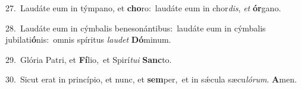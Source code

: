 {\numbfont\textcolor{\numbcolor}{27.}}~Laudáte eum in týmpano, et \textbf{cho}\-ro:~\star laudáte eum in chor\-\textit{dis}\-, \textit{et} \textbf{ór}\-gano.\par
{\numbfont\textcolor{\numbcolor}{28.}}~Laudáte eum in cýmbalis benesonántibus:~\dagger laudáte eum in cýmbalis jubilati\-\textbf{ó}\-nis:~\star omnis spíritus \textit{lau}\-\textit{det} \textbf{Dó}\-minum.\par
{\numbfont\textcolor{\numbcolor}{29.}}~Glória Patri, et \textbf{Fí}\-lio,~\star et Spirí\-\textit{tu}\-\textit{i} \textbf{Sanc}\-to.\par
{\numbfont\textcolor{\numbcolor}{30.}}~Sicut erat in princípio, et nunc, et \textbf{sem}\-per,~\star et in sǽcula sæcu\-\textit{ló}\-\textit{rum}. \textbf{A}\-men.\par
